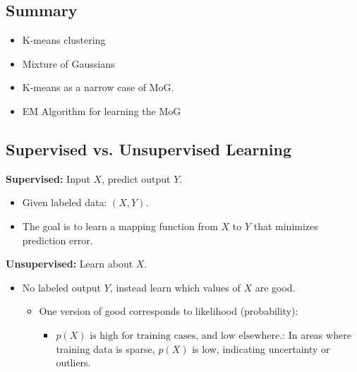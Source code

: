 \subsection{Summary}
\begin{intuition}
    \begin{itemize}
        \item K-means clustering 
        \item Mixture of Gaussians
        \item K-means as a narrow case of MoG.
        \item EM Algorithm for learning the MoG
    \end{itemize}
\end{intuition}
\subsection{Supervised vs. Unsupervised Learning}
\begin{intuition}

    \textbf{Supervised:} Input \( X \), predict output \( Y \).
    \begin{itemize}
        \item Given labeled data: \( (X, Y) \).
        \item The goal is to learn a mapping function from \( X \) to \( Y \) that minimizes prediction error.
    \end{itemize}

    \textbf{Unsupervised:} Learn about \( X \).
    \begin{itemize}
        \item No labeled output \( Y \), instead learn which values of \( X \) are good.
        \begin{itemize}
            \item One version of good corresponds to likelihood (probability): 
            \begin{itemize}
                \item $p(X) \text{ is high for training cases, and low elsewhere.}$: In areas where training data is sparse, \( p(X) \) is low, indicating uncertainty or outliers.
            \end{itemize}
        \end{itemize}
    \end{itemize}
\end{intuition}

